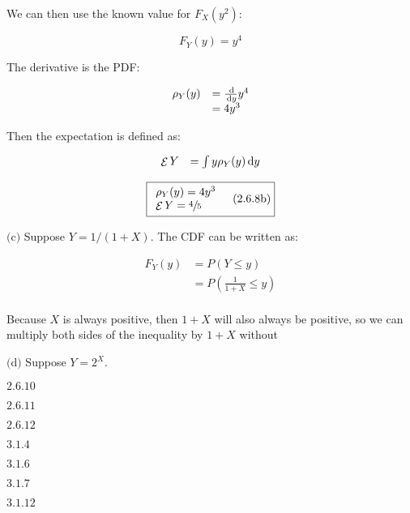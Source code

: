 \documentclass{article}
\newcommand{\problem}[2]{$\boxed{\text{#1.#2}}$}
\newcommand{\subproblem}[3]{$\boxed{\text{(#3)}}$}
\newcommand{\subsolution}[4]{\boxed{#4\quad(\text{#1.#2#3})}}
\renewcommand{\d}[1]{\,\textnormal{d}#1}
\newcommand{\dd}[2]{\frac{\d{#1}}{\d{#2}}}
\DeclareMathOperator{\E}{\mathcal{E}}
\begin{document}
We can then use the known value for $F_X(y^2)$:

\[
F_Y(y)=y^4
\]

The derivative is the PDF:

\[
\begin{array}{ll}
\rho_Y(y)&=\dd{}{y} y^4 \\
&=4y^3 \\
\end{array}
\]

Then the expectation is defined as:

\[
\begin{array}{ll}
\E Y&=\int y\rho_Y(y) \d{y} \\
\end{array}
\]

\[
\subsolution{2.6}{8}{b}{\begin{array}{l}
\rho_Y(y)=4y^3 \\
\E Y=\sfrac{4}{5}
\end{array}}
\]

%
\subproblem{2.6}{8}{c} Suppose $Y=1/(1+X)$. The CDF can be written as:

\[
\begin{array}{rl}
F_Y(y)&=P(Y\le y) \\
&=P\left(\frac{1}{1+X}\le y\right) \\
\end{array}
\]

Because $X$ is always positive, then $1+X$ will also always be
positive, so we can multiply both sides of the inequality by $1+X$ without

%
\subproblem{2.6}{8}{d} Suppose $Y=2^X$.

%
\problem{2.6}{10}

%
\problem{2.6}{11}

%
\problem{2.6}{12}

%
\problem{3.1}{4}

%
\problem{3.1}{6}

%
\problem{3.1}{7}

%
\problem{3.1}{12}
\end{document}
